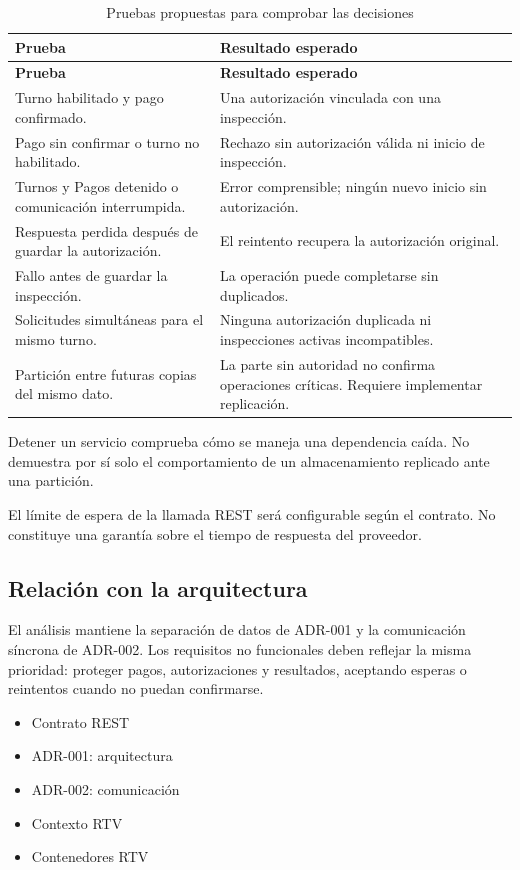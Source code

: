 \documentclass[11pt,a4paper]{article}
\begin{document}
\begin{xltabular}{\textwidth}{L{4.2cm}X}
  \caption{Pruebas propuestas para comprobar las decisiones}\label{tab:pruebas-cap}\\
  \toprule
  \textbf{Prueba} & \textbf{Resultado esperado} \\
  \midrule
  \endfirsthead
  \toprule
  \textbf{Prueba} & \textbf{Resultado esperado} \\
  \midrule
  \endhead
  \bottomrule
  \endfoot
  Turno habilitado y pago confirmado. & Una autorización vinculada con una inspección. \\
  Pago sin confirmar o turno no habilitado. & Rechazo sin autorización válida ni inicio de inspección. \\
  Turnos y Pagos detenido o comunicación interrumpida. & Error comprensible; ningún nuevo inicio sin autorización. \\
  Respuesta perdida después de guardar la autorización. & El reintento recupera la autorización original. \\
  Fallo antes de guardar la inspección. & La operación puede completarse sin duplicados. \\
  Solicitudes simultáneas para el mismo turno. & Ninguna autorización duplicada ni inspecciones activas incompatibles. \\
  Partición entre futuras copias del mismo dato. & La parte sin autoridad no confirma operaciones críticas. Requiere implementar replicación. \\
\end{xltabular}

Detener un servicio comprueba cómo se maneja una dependencia caída. No demuestra por sí solo el comportamiento de un almacenamiento replicado ante una partición.

El límite de espera de la llamada REST será configurable según el contrato. No constituye una garantía sobre el tiempo de respuesta del proveedor.

\subsection{Relación con la arquitectura}

El análisis mantiene la separación de datos de ADR-001 y la comunicación síncrona de ADR-002. Los requisitos no funcionales deben reflejar la misma prioridad: proteger pagos, autorizaciones y resultados, aceptando esperas o reintentos cuando no puedan confirmarse.

\begin{itemize}[nosep]
  \item Contrato REST
  \item ADR-001: arquitectura
  \item ADR-002: comunicación
  \item Contexto RTV
  \item Contenedores RTV
\end{itemize}
\end{document}
